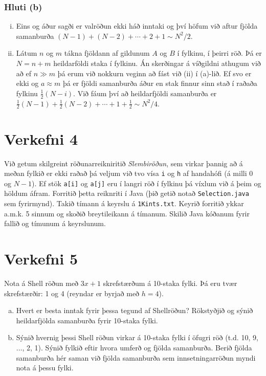 \documentclass[12pt, a4paper, hidelinks]{article}
\begin{document}
\subsubsection*{Hluti (b)}
    \begin{enumerate}[(i)]
       \item Eins og áður sagði er valröðun ekki háð inntaki og því höfum við aftur fjölda samanburða $(N - 1) + (N - 2) + \cdots + 2 + 1 \sim N^2/2$.
       \item Látum $n$ og $m$ tákna fjöldann af gildunum $A$ og $B$ í fylkinu, í þeirri röð. Þá er $N = n + m$ heildarföldi staka í fylkinu. Án skerðingar á
       víðgildni athugum við að ef $n \gg m$ þá erum við nokkurn veginn að fást við (ii) í (a)-lið. Ef svo er ekki og $a \approx m$ þá er fjöldi samanburða áður
       en stak finnur sinn stað í raðaða fylkinu $\frac 12 (N - i)$. Við fáum því að heildarfjöldi samanburða er $\frac 12 (N - 1) + \frac 12 (N - 2) + \cdots + 1 + \frac 12 \sim N^2/4$.
    \end{enumerate}

\newpage

\section*{Verkefni 4}
Við getum skilgreint röðunarreikniritið \emph{Slembiröðun}, sem virkar þannig að á meðan fylkið
er ekki raðað þá veljum við tvo vísa \texttt{i} og \texttt{h} af handahófi (á milli $0$ og $N - 1$). Ef
stök \texttt{a[i]} og \texttt{a[j]} eru í langri röð í fylkinu þá víxlum við á þeim og höldum áfram. Forritið
þetta reiknriti í Java (þið getið notað \texttt{Selection.java} sem fyrirmynd). Takið tímann á keyrslu á \texttt{1Kints.txt}.
Keyrið forritið ykkar a.m.k. 5 sinnum og skoðið breytileikann á tímanum. Skilið Java kóðanum fyrir fallið og tímunum á keyrslunum.

\newpage

\section*{Verkefni 5}
Nota á Shell röðun með $3x + 1$ skrefstærðum á 10-staka fylki. Þá eru tvær skrefstærðir: 1 og 4 (reyndar er byrjað með $h = 4$).
\begin{enumerate}[(a)]
    \item Hvert er besta inntak fyrir þessa tegund af Shellröðun? Rökstyðjið og sýnið heildarfjölda
    samanburða fyrir 10-staka fylki.
    \item Sýnið hvernig þessi Shell röðun virkar á 10-staka fylki í öfugri röð (t.d. 10, 9, $\ldots$\@ , 2, 1).
    Sýnið fylkið eftir hvora umferð og fjölda samanburða. Berið fjölda samanburða hér saman við fjölda samanburða
    sem innsetningarröðun myndi nota á þessu fylki.
\end{enumerate}
\end{document}
